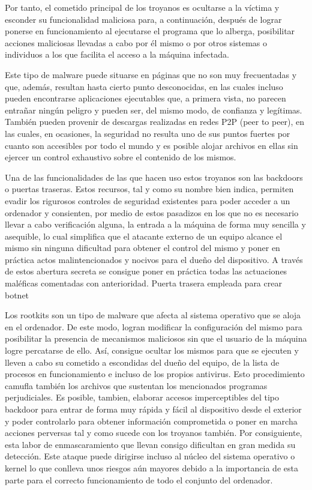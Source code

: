 Por tanto, el cometido principal de los troyanos es ocultarse a la víctima y esconder su funcionalidad maliciosa para, a continuación, después de lograr ponerse en funcionamiento al ejecutarse el programa que lo alberga, posibilitar acciones maliciosas llevadas a cabo por él mismo o por otros sistemas o individuos a los que facilita el acceso a la máquina infectada.

Este tipo de malware puede situarse en páginas que no son muy frecuentadas y que, además, resultan hasta cierto punto desconocidas, en las cuales incluso pueden encontrarse aplicaciones ejecutables que, a primera vista, no parecen entrañar ningún peligro y pueden ser, del mismo modo, de confianza y legítimas. También pueden provenir de descargas realizadas en redes P2P (peer to peer), en las cuales, en ocasiones, la seguridad no resulta uno de sus puntos fuertes por cuanto son accesibles por todo el mundo y es posible alojar archivos en ellas sin ejercer un control exhaustivo sobre el contenido de los mismos.

Una de las funcionalidades de las que hacen uso estos troyanos son las backdoors o puertas traseras. Estos recursos, tal y como su nombre bien indica, permiten evadir los rigurosos controles de seguridad existentes para poder acceder a un ordenador y consienten, por medio de estos pasadizos en los que no es necesario llevar a cabo verificación alguna, la entrada a la máquina de forma muy sencilla y asequible, lo cual simplifica que el atacante externo de un equipo alcance el mismo sin ninguna dificultad para obtener el control del mismo y poner en práctica actos malintencionados y nocivos para el dueño del dispositivo. A través de estos abertura secreta se consigue poner en práctica todas las actuaciones maléficas comentadas con anterioridad. Puerta trasera empleada para crear botnet

Los rootkits son un tipo de malware que afecta al sistema operativo que se aloja en el ordenador. De este modo, logran modificar la configuración del mismo para posibilitar la presencia de mecanismos maliciosos sin que el usuario de la máquina logre percatarse de ello. Así, consigue ocultar los mismos para que se ejecuten y lleven a cabo su cometido a escondidas del dueño del equipo, de la lista de procesos en funcionamiento e incluso de los propios antivirus. Esto procedimiento camufla también los archivos que sustentan los mencionados programas perjudiciales. Es posible, tambien, elaborar accesos imperceptibles del tipo backdoor para entrar de forma muy rápida y fácil al dispositivo desde el exterior y poder controlarlo para obtener información comprometida o poner en marcha acciones perversas tal y como sucede con los troyanos también. Por consiguiente, esta labor de enmascaramiento que llevan consigo dificultan en gran medida su detección. Este ataque puede dirigirse incluso al núcleo del sistema operativo o kernel lo que conlleva unos riesgos aún mayores debido a la importancia de esta parte para el correcto funcionamiento de todo el conjunto del ordenador.

